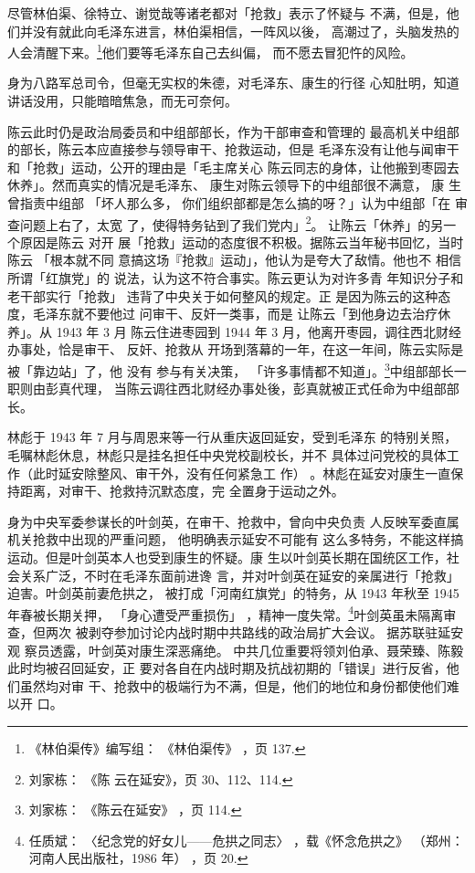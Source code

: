 尽管林伯渠、徐特立、谢觉哉等诸老都对「抢救」表示了怀疑与
不满，但是，他们并没有就此向毛泽东进言，林伯渠相信，一阵风以後，
高潮过了，头脑发热的人会清醒下来。\footnote{《林伯渠传》编写组：
《林伯渠传》
，页 137.}他们要等毛泽东自己去纠偏，
而不愿去冒犯忤的风险。

身为八路军总司令，但毫无实权的朱德，对毛泽东、康生的行径
心知肚明，知道讲话没用，只能暗暗焦急，而无可奈何。

陈云此时仍是政治局委员和中组部部长，作为干部审查和管理的 最高机关中组部
的部长，陈云本应直接参与领导审干、抢救运动，但是 毛泽东没有让他与闻审干
和「抢救」运动，公开的理由是「毛主席关心 陈云同志的身体，让他搬到枣园去
休养」。然而真实的情况是毛泽东、 康生对陈云领导下的中组部很不满意， 康
生曾指责中组部 「坏人那么多， 你们组织部都是怎么搞的呀？」认为中组部「在
审查问题上右了，太宽 了，使得特务钻到了我们党内」\footnote{刘家栋： 《陈
云在延安》，页 30、112、114.}。 让陈云「休养」的另一个原因是陈云 对开
展「抢救」运动的态度很不积极。据陈云当年秘书回忆，当时陈云 「根本就不同
意搞这场『抢救』运动」，他认为是夸大了敌情。他也不 相信所谓「红旗党」的
说法，认为这不符合事实。陈云更认为对许多青 年知识分子和老干部实行「抢救」
违背了中央关于如何整风的规定。正 是因为陈云的这种态度，毛泽东就不要他过
问审干、反奸一类事，而是 让陈云「到他身边去治疗休养」。从 1943 年 3 月
陈云住进枣园到 1944 年 3 月，他离开枣园，调往西北财经办事处，恰是审干、
反奸、抢救从 开场到落幕的一年，在这一年间，陈云实际是被「靠边站」了，他
没有
参与有关决策，
「许多事情都不知道」。\footnote{刘家栋：
《陈云在延安》
，页 114.}中组部部长一职则由彭真代理，
当陈云调往西北财经办事处後，彭真就被正式任命为中组部部长。

林彪于 1943 年 7 月与周恩来等一行从重庆返回延安，受到毛泽东
的特别关照，毛嘱林彪休息，林彪只是挂名担任中央党校副校长，并不
具体过问党校的具体工作（此时延安除整风、审干外，没有任何紧急工
作）
。林彪在延安对康生一直保持距离，对审干、抢救持沉默态度，完
全置身于运动之外。

身为中央军委参谋长的叶剑英，在审干、抢救中，曾向中央负责
人反映军委直属机关抢救中出现的严重问题，
他明确表示延安不可能有
这么多特务，不能这样搞运动。但是叶剑英本人也受到康生的怀疑。康
生以叶剑英长期在国统区工作，社会关系广泛，不时在毛泽东面前进谗
言，并对叶剑英在延安的亲属进行「抢救」迫害。叶剑英前妻危拱之，
被打成「河南红旗党」的特务，从 1943 年秋至 1945 年春被长期关押，
「身心遭受严重损伤」
，精神一度失常。\footnote{任质斌：
〈纪念党的好女儿——危拱之同志〉
，载《怀念危拱之》
（郑州：河南人民出版社，1986 年）
，页 20.}叶剑英虽未隔离审查，但两次
被剥夺参加讨论内战时期中共路线的政治局扩大会议。
据苏联驻延安观
察员透露，叶剑英对康生深恶痛绝。
中共几位重要将领刘伯承、聂荣臻、陈毅此时均被召回延安，正
要对各自在内战时期及抗战初期的「错误」进行反省，他们虽然均对审
干、抢救中的极端行为不满，但是，他们的地位和身份都使他们难以开
口。

